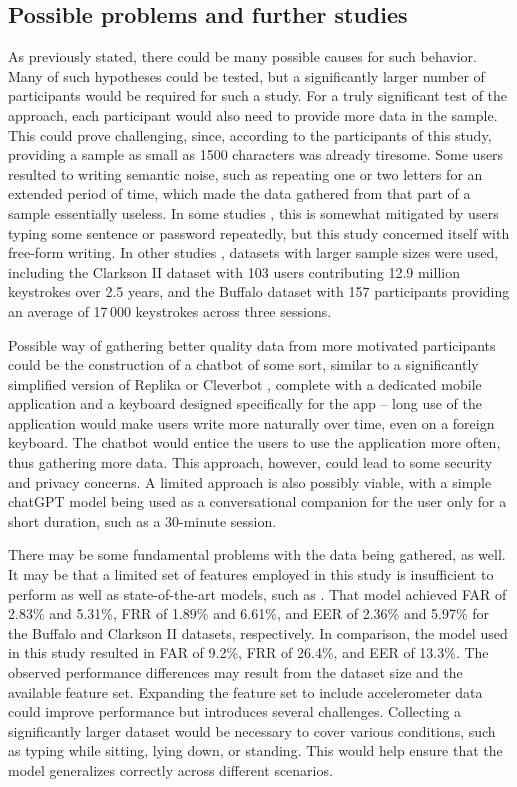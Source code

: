 \subsection{Possible problems and further studies}
As previously stated, there could be many possible causes for such behavior. Many of such hypotheses could be tested, but a significantly larger number of participants would be required for such a study. For a truly significant test of the approach, each participant would also need to provide more data in the sample. This could prove challenging, since, according to the participants of this study, providing a sample as small as 1500 characters was already tiresome. Some users resulted to writing semantic noise, such as repeating one or two letters for an extended period of time, which made the data gathered from that part of a sample essentially useless. In some studies \cite{Abde2023}, this is somewhat mitigated by users typing some sentence or password repeatedly, but this study concerned itself with free-form writing. In other studies \cite{Lu2020}, datasets with larger sample sizes were used, including the Clarkson II dataset with 103 users contributing 12.9 million keystrokes over 2.5 years, and the Buffalo dataset with 157 participants providing an average of 17\,000 keystrokes across three sessions.

Possible way of gathering better quality data from more motivated participants could be the construction of a chatbot of some sort, similar to a significantly simplified version of Replika \cite{replika} or Cleverbot \cite{cleverbot}, complete with a dedicated mobile application and a keyboard designed specifically for the app -- long use of the application would make users write more naturally over time, even on a foreign keyboard. The chatbot would entice the users to use the application more often, thus gathering more data. This approach, however, could lead to some security and privacy concerns. A limited approach is also possibly viable, with a simple chatGPT model being used as a conversational companion for the user only for a short duration, such as a 30-minute session.

There may be some fundamental problems with the data being gathered, as well. It may be that a limited set of features employed in this study is insufficient to perform as well as state-of-the-art models, such as \cite{Lu2020}. That model achieved FAR of 2.83\% and 5.31\%, FRR of 1.89\% and 6.61\%, and EER of 2.36\% and 5.97\% for the Buffalo and Clarkson II datasets, respectively. In comparison, the model used in this study resulted in FAR of 9.2\%, FRR of 26.4\%, and EER of 13.3\%. The observed performance differences may result from the dataset size and the available feature set. Expanding the feature set to include accelerometer data could improve performance but introduces several challenges. Collecting a significantly larger dataset would be necessary to cover various conditions, such as typing while sitting, lying down, or standing. This would help ensure that the model generalizes correctly across different scenarios.

